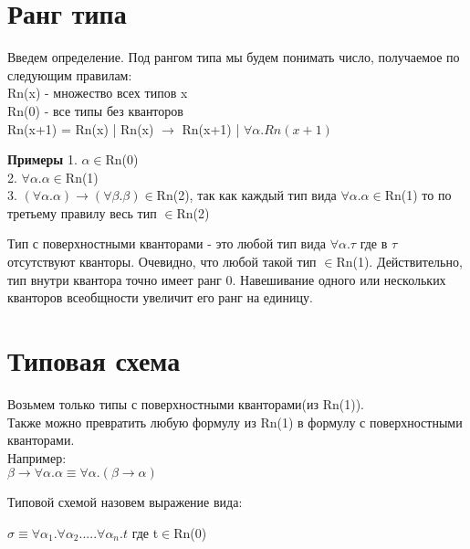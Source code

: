 	\section{Ранг типа}
	\begin{definition}
		 Введем определение. Под {рангом типа} мы будем понимать число, получаемое по следующим правилам: \\
	    Rn(x) - множество всех типов x\\
	    Rn(0) - все типы без кванторов\\
	    Rn(x+1) = Rn(x) | Rn(x) $\rightarrow$ Rn(x+1) | $\forall\alpha.Rn(x+1)$
	\end{definition}
	 
	\textbf{Примеры}
	 1. $ \alpha\in $Rn(0) \\
	 2. $ \forall\alpha.\alpha \in$Rn(1)\\
	 3. $ (\forall\alpha.\alpha)\rightarrow(\forall\beta.\beta) \in$Rn(2), так как каждый тип вида $ \forall\alpha.\alpha \in$Rn(1) то по третьему правилу весь тип $ \in $Rn(2) \\

	\begin{definition}
		Тип с поверхностными кванторами - это любой тип вида $ \forall\alpha.\tau $ где в $ \tau $ отсутствуют кванторы. Очевидно, что любой такой тип $ \in $Rn(1). Действительно, тип внутри квантора точно имеет ранг 0. Навешивание одного или нескольких кванторов всеобщности увеличит его ранг на единицу.
	\end{definition}
	 
	 \section{Типовая схема}
	 Возьмем только типы с поверхностными кванторами(из Rn(1)). \\
	 Также можно превратить любую формулу из Rn(1) в формулу с поверхностными кванторами. \\
	 Например:\\ 
	 $ \beta\rightarrow\forall\alpha.\alpha\equiv\forall\alpha.(\beta\rightarrow\alpha) $
	 \\
	 
	 \begin{definition}
	 	{Типовой схемой} назовем выражение вида: 

\begin{center}
		 $ \sigma\equiv\forall\alpha_1.\forall\alpha_2.....\forall\alpha_n.t $ где t$ \in $Rn(0)
\end{center}
	 	 \end{definition}
 	 
